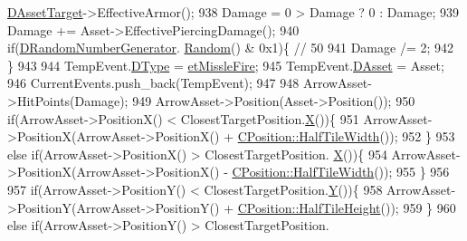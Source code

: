 \begin{DoxyCode}
{      \hyperlink{structSAssetCommand_a3d9b43f6e59c386c48c41a65448a0c39}{DAssetTarget}->EffectiveArmor();
938                             Damage = 0 > Damage ? 0 : Damage;
939                             Damage += Asset->EffectivePiercingDamage();
940                             \textcolor{keywordflow}{if}(\hyperlink{classCGameModel_a3fb9b6b40f397c022087f381f63954b9}{DRandomNumberGenerator}.
      \hyperlink{classCRandomNumberGenerator_aa7fc51bde5647d15df2f1b9826702ca2}{Random}() & 0x1)\{ \textcolor{comment}{// 50%
941                                 Damage /= 2;
942                             \}
943                             
944                             TempEvent.\hyperlink{structSGameEvent_afa10562e243f4ac2b473b655cc58fee7}{DType} = \hyperlink{GameModel_8h_abfcf510bafec7c6429906a6ecaac656dae891b2dee1677bb6a343c0ca8c01fa0e}{etMissleFire};
945                             TempEvent.\hyperlink{structSGameEvent_a40c85eeac83b96887b7449c9bdc5d624}{DAsset} = Asset;
946                             CurrentEvents.push\_back(TempEvent);
947                             
948                             ArrowAsset->HitPoints(Damage);
949                             ArrowAsset->Position(Asset->Position());
950                             \textcolor{keywordflow}{if}(ArrowAsset->PositionX() < ClosestTargetPosition.\hyperlink{classCPosition_a9a6b94d3b91df1492d166d9964c865fc}{X}())\{
951                                 ArrowAsset->PositionX(ArrowAsset->PositionX() + 
      \hyperlink{classCPosition_a4b799a0fb78ddd8bbd8548980e2458af}{CPosition::HalfTileWidth}());
952                             \}
953                             \textcolor{keywordflow}{else} \textcolor{keywordflow}{if}(ArrowAsset->PositionX() > ClosestTargetPosition.
      \hyperlink{classCPosition_a9a6b94d3b91df1492d166d9964c865fc}{X}())\{
954                                 ArrowAsset->PositionX(ArrowAsset->PositionX() - 
      \hyperlink{classCPosition_a4b799a0fb78ddd8bbd8548980e2458af}{CPosition::HalfTileWidth}());
955                             \}
956                             
957                             \textcolor{keywordflow}{if}(ArrowAsset->PositionY() < ClosestTargetPosition.\hyperlink{classCPosition_a1aa8a30e2f08dda1f797736ba8c13a87}{Y}())\{
958                                 ArrowAsset->PositionY(ArrowAsset->PositionY() + 
      \hyperlink{classCPosition_a5e371060b1aa0d3d3c5df1e353e0e5fd}{CPosition::HalfTileHeight}());
959                             \}
960                             \textcolor{keywordflow}{else} \textcolor{keywordflow}{if}(ArrowAsset->PositionY() > ClosestTargetPosition.
}}
\end{DoxyCode}
